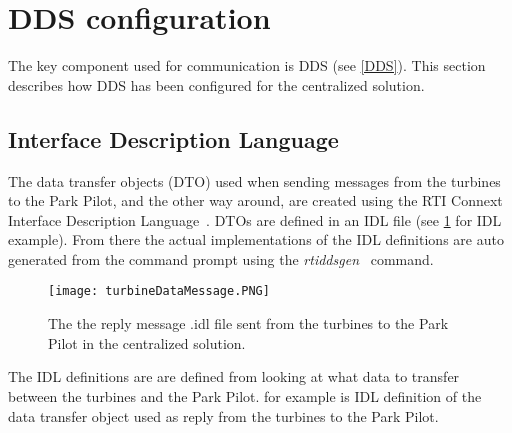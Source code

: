 \section{DDS configuration}\label{sec:ddsConfigCen} 

The key component used for communication is DDS (see \cref{DDS}). This section describes how DDS has been configured for the centralized solution.

\subsection{Interface Description Language}

The data transfer objects (DTO) used when sending messages from the turbines to the Park Pilot, and the other way around, are created using the RTI Connext Interface Description Language~\cite{rtiConnextUsersManual}. DTOs are defined in an IDL file (see \cref{fig:cenTurbineDataMessage} for IDL example). From there the actual implementations of the IDL definitions are auto generated from the command prompt using the \textit{rtiddsgen}~\cite{rtiConnextUsersManual} command.

\begin{figure}
	\centering
	\texttt{[image: turbineDataMessage.PNG]} 
	\caption[Centralized turbine reply message]{
		\label{fig:cenTurbineDataMessage} 
		\footnotesize{%
			The the reply message .idl file sent from the turbines to the Park Pilot in the centralized solution.
		}
	}
\end{figure}

The IDL definitions are are defined from looking at what data to transfer between the turbines and the Park Pilot.  for example is IDL definition of the data transfer object used as reply from the turbines to the Park Pilot. 

%
%
%	
%

